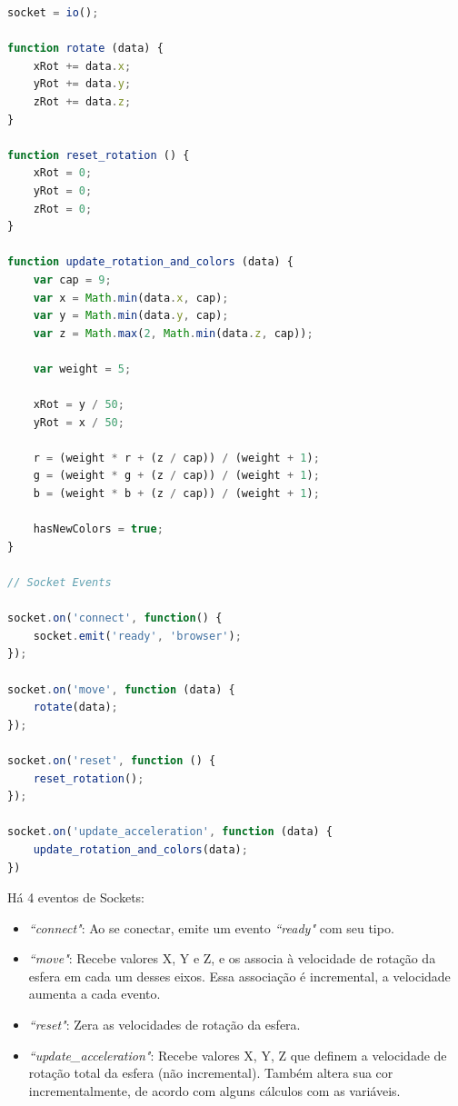 \documentclass[a4paper,12pt]{article}
\begin{document}
\begin{lstlisting}[language=JavaScript]
socket = io();

function rotate (data) {
    xRot += data.x;
    yRot += data.y;
    zRot += data.z;
}

function reset_rotation () {
    xRot = 0;
    yRot = 0;
    zRot = 0;
}

function update_rotation_and_colors (data) {
    var cap = 9;
    var x = Math.min(data.x, cap);
    var y = Math.min(data.y, cap);
    var z = Math.max(2, Math.min(data.z, cap));

    var weight = 5;

    xRot = y / 50;
    yRot = x / 50;

    r = (weight * r + (z / cap)) / (weight + 1);
    g = (weight * g + (z / cap)) / (weight + 1);
    b = (weight * b + (z / cap)) / (weight + 1);

    hasNewColors = true;
}

// Socket Events

socket.on('connect', function() {
    socket.emit('ready', 'browser');
});

socket.on('move', function (data) {
    rotate(data);
});

socket.on('reset', function () {
    reset_rotation();
});

socket.on('update_acceleration', function (data) {
    update_rotation_and_colors(data);
})
\end{lstlisting}

Há 4 eventos de Sockets:

\begin{itemize}

  \item \emph{“connect"}: Ao se conectar, emite um evento \emph{“ready"} com seu tipo.

  \item \emph{“move"}: Recebe valores X, Y e Z, e os associa à velocidade de rotação da esfera em cada um desses eixos. Essa associação é incremental, a velocidade aumenta a cada evento.

  \item \emph{“reset"}: Zera as velocidades de rotação da esfera.

  \item \emph{“update\_acceleration"}: Recebe valores X, Y, Z que definem a velocidade de rotação total da esfera (não incremental). Também altera sua cor incrementalmente, de acordo com alguns cálculos com as variáveis.

\end{itemize}
\end{document}
